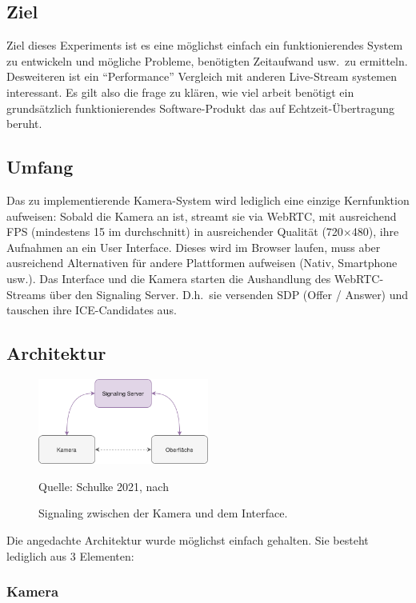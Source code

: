 \documentclass{article}
\newcommand{\figuresource}[1]{
	\begin{center}Quelle: #1\end{center}
}
\begin{document}
\begin{onecolumn}
\subsection{Ziel}
Ziel dieses Experiments ist es eine möglichst einfach ein funktionierendes
System zu entwickeln und mögliche Probleme, benötigten Zeitaufwand usw.\ zu
ermitteln.  Desweiteren ist ein ``Performance'' Vergleich mit anderen
Live-Stream systemen interessant. Es gilt also die frage zu klären, wie viel
arbeit benötigt ein grundsätzlich funktionierendes Software-Produkt das auf
Echtzeit-Übertragung beruht.

\subsection{Umfang}

Das zu implementierende Kamera-System wird lediglich eine einzige
Kernfunktion aufweisen: Sobald die Kamera an ist, streamt sie via
WebRTC, mit ausreichend FPS (mindestens 15 im durchschnitt) in
ausreichender Qualität (720$\times$480), ihre Aufnahmen an ein User
Interface. Dieses wird im Browser laufen, muss aber ausreichend
Alternativen für andere Plattformen aufweisen (Nativ, Smartphone
usw.). Das Interface und die Kamera starten die Aushandlung des
WebRTC-Streams über den Signaling Server. D.h.\ sie versenden SDP
(Offer / Answer) und tauschen ihre ICE-Candidates aus.

\subsection{Architektur}

\begin{figure}[ht]
	\includegraphics[width=0.5\textwidth]{diagram-signaling}
	\centering
	\caption{Signaling zwischen der Kamera und dem Interface.}
	\figuresource{Schulke 2021, nach~\cite{WebRTC}}
\end{figure}

Die angedachte Architektur wurde möglichst einfach gehalten. Sie besteht
lediglich aus 3 Elementen:

\subsubsection{Kamera}


\end{onecolumn}
\end{document}
